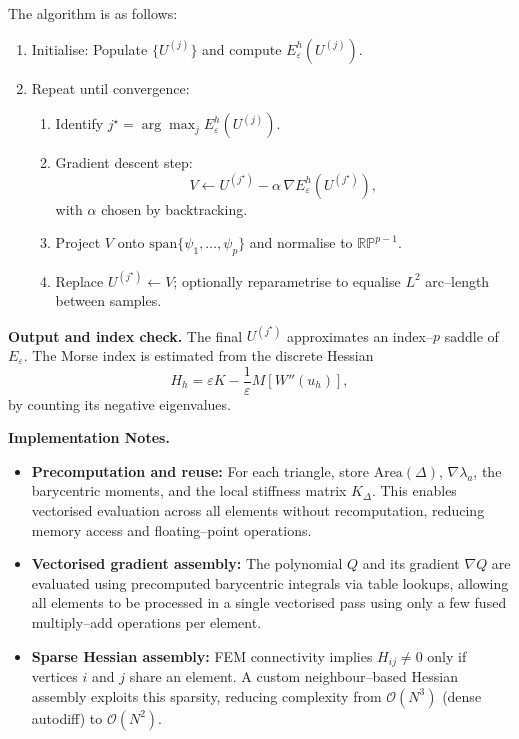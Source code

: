 \noindent The algorithm is as follows:
\begin{enumerate}
    \item Initialise: Populate $\{U^{(j)}\}$ and compute $E_{\varepsilon}^{h}(U^{(j)})$.
    \item Repeat until convergence:
    \begin{enumerate}
        \item Identify $j^{\star} = \arg\max_{j} E_{\varepsilon}^{h}(U^{(j)})$.
        \item Gradient descent step:
        \[
        V \gets U^{(j^{\star})} - \alpha \, \nabla E_{\varepsilon}^{h}(U^{(j^{\star})}),
        \]
        with $\alpha$ chosen by backtracking.
        \item Project $V$ onto $\mathrm{span}\{\psi_{1},\dots,\psi_{p}\}$ and normalise to $\mathbb{RP}^{p-1}$.
        \item Replace $U^{(j^{\star})} \gets V$; optionally reparametrise to equalise $L^{2}$ arc--length between samples.
    \end{enumerate}
\end{enumerate}

\noindent\textbf{Output and index check.}
The final $U^{(j^{\star})}$ approximates an index--$p$ saddle of $E_{\varepsilon}$.  
The Morse index is estimated from the discrete Hessian
\[
H_{h} = \varepsilon K - \frac{1}{\varepsilon} M[W''(u_{h})],
\]
by counting its negative eigenvalues.

\noindent\textbf{Implementation Notes.}

\begin{itemize}
    \item \textbf{Precomputation and reuse:} For each triangle, store 
    \(\mathrm{Area}(\Delta)\), \(\nabla \lambda_a\), the barycentric moments, and the 
    local stiffness matrix \(K_\Delta\).  
    This enables vectorised evaluation across all elements without recomputation, 
    reducing memory access and floating–point operations.

    \item \textbf{Vectorised gradient assembly:} The polynomial \(Q\) and its gradient 
    \(\nabla Q\) are evaluated using precomputed barycentric integrals via table lookups, 
    allowing all elements to be processed in a single vectorised pass using only a few 
    fused multiply–add operations per element.

    \item \textbf{Sparse Hessian assembly:} FEM connectivity implies \(H_{ij} \neq 0\) only 
    if vertices \(i\) and \(j\) share an element.  
    A custom neighbour–based Hessian assembly exploits this sparsity, reducing complexity 
    from \(\mathcal{O}(N^3)\) (dense autodiff) to \(\mathcal{O}(N^2)\).
\end{itemize}

